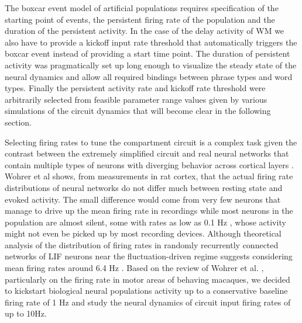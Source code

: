 \documentclass[10pt]{article}
\begin{document}
The boxcar event model of artificial populations requires specification of the starting point of events, the persistent firing rate of the population and the duration of the persistent activity.
In the case of the delay activity of WM we also have to provide a kickoff input rate threshold that automatically triggers the boxcar event instead of providing a start time point.
The duration of persistent activity was pragmatically set up long enough to visualize the steady state of the neural dynamics and allow all required bindings between phrase types and word types.
Finally the persistent activity rate and kickoff rate threshold were arbitrarily selected from feasible parameter range values given by various simulations of the circuit dynamics that will become clear in the following section.

Selecting firing rates to tune the compartment circuit is a complex task given the contrast between the extremely simplified circuit and real neural networks that contain multiple types of neurons with diverging behavior across cortical layers \cite{Wohrer_2013}.
Wohrer et al \cite{Wohrer_2013} shows, from measurements in rat cortex, that the actual firing rate distributions of neural networks do not differ much between resting state and evoked activity.
The small difference would come from very few neurons that manage to drive up the mean firing rate in recordings while most neurons in the population are almost silent, some with rates as low as 0.1 Hz \cite{Kerr_2005}, whose activity might not even be picked up by most recording devices.
Although theoretical analysis of the distribution of firing rates in randomly recurrently connected networks of LIF neurons near the fluctuation-driven regime suggests considering mean firing rates around 6.4 Hz \cite{Roxin_2011}.
Based on the review of Wohrer et al. \cite{Wohrer_2013}, particularly on the firing rate in motor areas of behaving macaques, we decided to kickstart biological neural populations activity up to a conservative baseline firing rate of 1 Hz and study the neural dynamics of circuit input firing rates of up to 10Hz.
\end{document}
